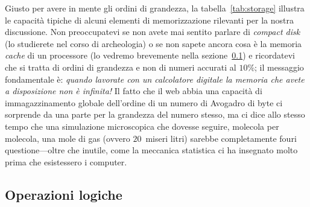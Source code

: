 \begin{table}[!htb]
\end{table}

Giusto per avere in mente gli ordini di grandezza, la tabella~\ref{tab:storage}
illustra le capacit\`a tipiche di alcuni elementi di memorizzazione rilevanti per la
nostra discussione. Non preoccupatevi se non avete mai sentito parlare di
\emph{compact disk} (lo studierete nel corso di archeologia) o se non sapete ancora
cosa \`e la memoria \emph{cache} di un processore (lo vedremo brevemente nella
sezione~\ref{}) e ricordatevi che si tratta di ordini di grandezza e non di numeri
accurati al $10$\%; il messaggio fondamentale \`e: \emph{quando lavorate con un calcolatore
digitale la memoria che avete a disposizione non \`e infinita!} Il fatto che il
web abbia una capacit\`a di immagazzinamento globale dell'ordine di un numero di
Avogadro di byte ci sorprende da una parte per la grandezza del numero stesso, ma
ci dice allo stesso tempo che una simulazione microscopica che dovesse seguire, molecola
per molecola, una mole di gas (ovvero $20$~miseri litri) sarebbe completamente
fouri questione---oltre che inutile, come la meccanica statistica ci ha insegnato
molto prima che esistessero i computer.


\subsection{Operazioni logiche}


